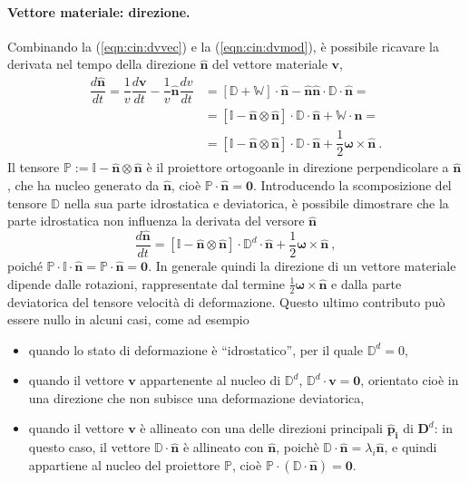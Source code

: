 \paragraph{Vettore materiale: direzione.}
Combinando la (\ref{eqn:cin:dvvec}) e la (\ref{eqn:cin:dvmod}), è possibile ricavare la derivata nel tempo della direzione $\bm{\hat{n}}$ del vettore materiale $\bm{v}$,
\begin{equation}
\begin{aligned}
 \dfrac{d \bm{\hat{n}}}{d t} = \dfrac{1}{v}\dfrac{d\bm{v}}{dt} - \dfrac{1}{v} \bm{\hat{n}} \dfrac{d v}{d t}  & = [ \mathbb{D} + \mathbb{W} ] \cdot \bm{\hat{n}} - \bm{\hat{n}} \bm{\hat{n}} \cdot \mathbb{D} \cdot \bm{\hat{n}} = \\
   & =  [ \mathbb{I} - \bm{\hat{n}} \otimes \bm{\hat{n}} ] \cdot \mathbb{D} \cdot \bm{\hat{n}} + \mathbb{W} \cdot \bm{\hat{n}} = \\
   & = [ \mathbb{I} - \bm{\hat{n}} \otimes \bm{\hat{n}} ] \cdot \mathbb{D} \cdot \bm{\hat{n}} + \dfrac{1}{2} \bm{\omega} \times \bm{\hat{n}} \ .
\end{aligned}
\end{equation}
Il tensore $\mathbb{P} := \mathbb{I} - \bm{\hat{n}} \otimes \bm{\hat{n}}$ è il proiettore ortogoanle in direzione perpendicolare a $\bm{\hat{n}}$, che ha nucleo generato da $\bm{\hat{n}}$, cioè $\mathbb{P} \cdot \bm{\hat{n}} = \bm{0}$. Introducendo la scomposizione del tensore $\mathbb{D}$ nella sua parte idrostatica e deviatorica, è possibile dimostrare che la parte idrostatica non influenza la derivata del versore $\bm{\hat{n}}$ 
\begin{equation}
 \dfrac{d \bm{\hat{n}}}{d t} = [ \mathbb{I} - \bm{\hat{n}} \otimes \bm{\hat{n}} ] \cdot \mathbb{D}^d \cdot \bm{\hat{n}} + \dfrac{1}{2} \bm{\omega} \times \bm{\hat{n}} \ ,
\end{equation}
 poiché $\mathbb{P} \cdot \mathbb{I} \cdot \bm{\hat{n}} = \mathbb{P} \cdot \bm{\hat{n}} = \bm{0}$. In generale quindi la direzione di un vettore materiale dipende dalle rotazioni, rappresentate dal termine $\frac{1}{2} \bm{\omega} \times \bm{\hat{n}}$ e dalla parte deviatorica del tensore velocità di deformazione. Questo ultimo contributo può essere nullo in alcuni casi, come ad esempio
 \begin{itemize}
  \item quando lo stato di deformazione è ``idrostatico'', per il quale $\mathbb{D}^d = 0$,
  \item quando il vettore $\bm{v}$ appartenente al nucleo di $\mathbb{D}^d$, $\mathbb{D}^d \cdot \bm{v} = \bm{0}$, orientato cioè in una direzione che non subisce una deformazione deviatorica,
  \item quando il vettore $\bm{v}$ è allineato con una delle direzioni principali $\bm{\hat{p}_i}$ di $\bm{D}^d$: in questo caso, il vettore $\mathbb{D} \cdot \bm{\hat{n}}$ è allineato con $\bm{\hat{n}}$, poichè $\mathbb{D} \cdot \bm{\hat{n}} = \lambda_i \bm{\hat{n}}$, e quindi appartiene al nucleo del proiettore $\mathbb{P}$, cioè $\mathbb{P} \cdot (\mathbb{D} \cdot \bm{\hat{n}}) = \bm{0}$.
 \end{itemize}
 

